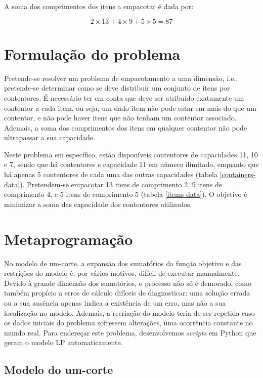\documentclass[12pt, a4paper, titlepage]{article}
\begin{document}
A soma dos comprimentos dos itens a empacotar é dada por:

$$2 \times 13 + 4 \times 9 + 5 \times 5 = 87$$

\section{Formulação do problema}

Pretende-se resolver um problema de empacotamento a uma dimensão, i.e., pretende-se determinar como
se deve distribuir um conjunto de itens por contentores. É necessário ter em conta que deve ser
atribuído exatamente um contentor a cada item, ou seja, um dado item não pode estar em mais do que
um contentor, e não pode haver itens que não tenham um contentor associado. Ademais, a soma dos
comprimentos dos itens em qualquer contentor não pode ultrapassar a sua capacidade.

Neste problema em específico, estão disponíveis contentores de capacidades 11, 10 e 7, sendo que há
contentores e capacidade 11 em número ilimitado, enquanto que há apenas 5 contentores de cada uma
das outras capacidades (tabela \ref{containers-data}). Pretendem-se empacotar 13 itens de
comprimento 2, 9 itens de comprimento 4, e 5 itens de comprimento 5 (tabela \ref{items-data}). O
objetivo é minimizar a soma das capacidade dos contentores utilizados.


\section{Metaprogramação}

No modelo de um-corte, a expansão dos sumatórios da função objetivo e das restrições do modelo é,
por vários motivos, difícil de executar manualmente. Devido à grande dimensão dos sumatórios, o
processo não só é demorado, como também propício a erros de cálculo difíceis de diagnosticar: uma
solução errada ou a sua ausência apenas indica a existência de um erro, mas não a sua localização
no modelo. Ademais, a recriação do modelo teria de ser repetida caso os dados iniciais do problema
sofressem alterações, uma ocorrência constante no mundo real. Para endereçar este problema,
desenvolvemos \emph{scripts} em Python que geram o modelo LP automaticamente.

\subsection{Modelo do um-corte}
\end{document}
